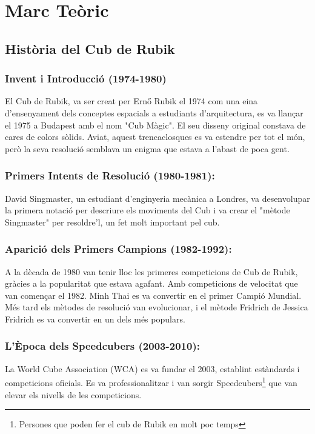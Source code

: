 \pagestyle{normal}
\part{Marc Teòric}
\chapter{Història del Cub de Rubik}

\section{Invent i Introducció (1974-1980)}

El Cub de Rubik, va ser creat per Ernő Rubik el 1974 com una eina d'ensenyament dels conceptes espacials a estudiants d'arquitectura, es va llançar el 1975 a Budapest amb el nom "Cub Màgic". El seu disseny original constava de cares de colors sòlids. Aviat, aquest trencaclosques es va estendre per tot el món, però la seva resolució semblava un enigma que estava a l'abast de poca gent.

\section{Primers Intents de Resolució (1980-1981):}

David Singmaster, un estudiant d'enginyeria mecànica a Londres, va desenvolupar la primera notació per descriure els moviments del Cub i va crear el "mètode Singmaster" per resoldre'l, un fet molt important pel cub.

\section{Aparició dels Primers Campions (1982-1992):}

A la dècada de 1980 van tenir lloc les primeres competicions de Cub de Rubik, gràcies a la popularitat que estava agafant. Amb competicions de velocitat que van començar el 1982. Minh Thai es va convertir en el primer Campió Mundial. Més tard els mètodes de resolució van evolucionar, i el mètode Fridrich de Jessica Fridrich es va convertir en un dels més populars.

\section{L'Època dels Speedcubers (2003-2010):}

La World Cube Association (WCA) es va fundar el 2003, establint estàndards i competicions oficials. Es va professionalitzar i van sorgir Speedcubers\footnote{Persones que poden fer el cub de Rubik en molt poc temps} que van elevar els nivells de les competicions.

